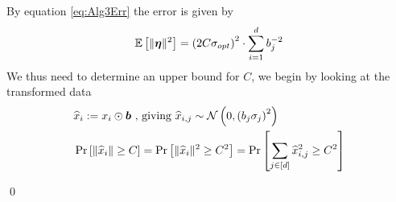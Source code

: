 \documentclass[a4paper,12pt]{article}
\renewenvironment{proof}{{\textit{Proof} \\}}{\qed}
\begin{document}
\begin{proof}
By equation \eqref{eq:Alg3Err} the error is given by
\begin{equation}
\label{eq:Alg3Err2}
    \mathbb{E} \left [ \| \bm{\eta} \|^2 \right] = \left (2C\sigma_{opt}\right)^2 \cdot 
    \sum_{i=1}^d b_j^{-2} 
\end{equation}
We thus need to determine an upper bound for $C$, we begin by looking at the transformed data
\begin{align*}
    &\widehat{x}_i := x_i \odot \bm{b} \textnormal{ , giving } \widehat{x}_{i,j} \sim \mathcal{N}\left (0,\left (b_j\sigma_j\right)^2\right) \\
    &\Pr\left [ \| \widehat{x}_i \| \ge C \right] =
    \Pr\left [ \| \widehat{x}_i \|^2 \ge C^2 \right] =
    \Pr\left [ \sum_{j \in [d]} \widehat{x}_{i,j}^2 \ge C^2 \right]
\end{align*}


\end{proof}
\end{document}
